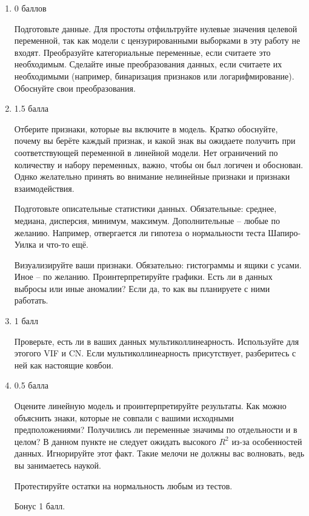 \documentclass[a4paper,12pt]{article}
\begin{document}
	\begin{enumerate}
		\item 0 баллов
		
		 Подготовьте данные. Для простоты отфильтруйте нулевые значения целевой переменной, так как модели с цензурированными выборками в эту работу не входят. Преобразуйте категориальные переменные, если считаете это необходимым. Сделайте иные преобразования данных, если считаете их необходимыми (например, бинаризация признаков или логарифмирование). Обоснуйте свои преобразования.
		
		\item 1.5 балла
		
		Отберите признаки, которые вы включите в модель. Кратко обоснуйте, почему вы берёте каждый признак, и какой знак вы ожидаете получить при соответствующей переменной в линейной модели. Нет ограничений по количеству и набору переменных, важно, чтобы он был логичен и обоснован. Однко желательно принять во внимание нелинейные признаки и признаки взаимодействия.
		
		Подготовьте описательные статистики данных. Обязательные: среднее, медиана, дисперсия, минимум, максимум. Дополнительные -- любые по желанию. Например, отвергается ли гипотеза о нормальности теста Шапиро-Уилка и что-то ещё.
		
		Визуализируйте ваши признаки. Обязательно: гистограммы и ящики с усами. Иное -- по желанию. Проинтерпретируйте графики. Есть ли в данных выбросы или иные аномалии? Если да, то как вы планируете с ними работать.
		
		\item 1 балл
		
		Проверьте, есть ли в ваших данных мультиколлинеарность. Используйте для этогого VIF и CN. Если мультиколлинеарность присутствует, разберитесь с ней как настоящие ковбои. 
		
		
		\item 
		0.5 балла
		
		 Оцените линейную модель и проинтерпретируйте результаты. Как можно объяснить знаки, которые не совпали с вашими исходными предположениями? Получились ли переменные значимы по отдельности и в целом? В данном пункте не следует ожидать высокого $ R^2 $ из-за особенностей данных. Игнорируйте этот факт. Такие мелочи не должны вас волновать, ведь вы занимаетесь наукой.
		 
		 Протестируйте остатки на нормальность любым из тестов.
		 
		 Бонус 1 балл.
		 

\end{enumerate}
\end{document}
